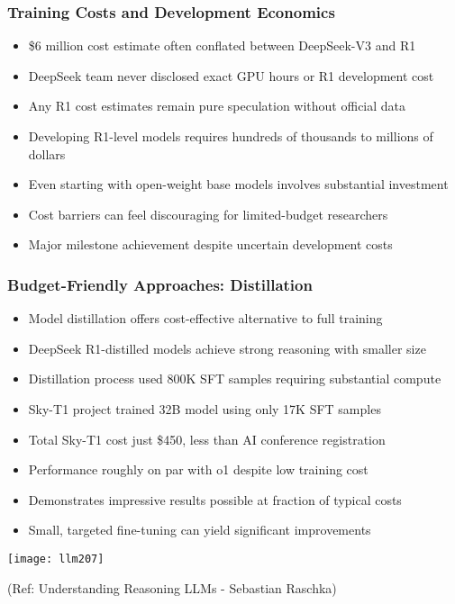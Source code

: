 \begin{frame}[fragile]\frametitle{Training Costs and Development Economics}
      \begin{itemize}
	\item \$6 million cost estimate often conflated between DeepSeek-V3 and R1
	\item DeepSeek team never disclosed exact GPU hours or R1 development cost
	\item Any R1 cost estimates remain pure speculation without official data
	\item Developing R1-level models requires hundreds of thousands to millions of dollars
	\item Even starting with open-weight base models involves substantial investment
	\item Cost barriers can feel discouraging for limited-budget researchers
	\item Major milestone achievement despite uncertain development costs
	  \end{itemize}
\end{frame}

\begin{frame}[fragile]\frametitle{Budget-Friendly Approaches: Distillation}
      \begin{itemize}
	\item Model distillation offers cost-effective alternative to full training
	\item DeepSeek R1-distilled models achieve strong reasoning with smaller size
	\item Distillation process used 800K SFT samples requiring substantial compute
	\item Sky-T1 project trained 32B model using only 17K SFT samples
	\item Total Sky-T1 cost just \$450, less than AI conference registration
	\item Performance roughly on par with o1 despite low training cost
	\item Demonstrates impressive results possible at fraction of typical costs
	\item Small, targeted fine-tuning can yield significant improvements
	  \end{itemize}
	  
  		\begin{center}
		\texttt{[image: llm207]}
		
		{\tiny (Ref: Understanding Reasoning LLMs - Sebastian Raschka)}

		\end{center}	  
\end{frame}

